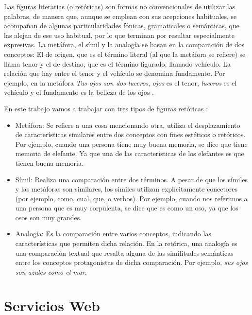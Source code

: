 Las figuras literarias (o retóricas) son formas no convencionales de utilizar las palabras, de manera que, aunque se emplean con sus acepciones habituales, se acompañan de algunas particularidades fónicas, gramaticales o semánticas, que las alejan de ese uso habitual, por lo que terminan por resultar especialmente expresivas. 
La metáfora, el símil y la analogía se basan en la comparación de dos conceptos: El de origen, que es el término literal (al que la metáfora se refiere) se llama tenor y el de destino, que es el término figurado, llamado vehículo. La relación que hay entre el tenor y el vehículo se denomina fundamento. Por ejemplo, en la metáfora \textit{Tus ojos son dos luceros}, \textit{ojos} es el tenor, \textit{luceros} es el vehículo y el fundamento es la belleza de los ojos \citep{GalianaYCasas1994}.


En este trabajo vamos a trabajar con tres tipos de figuras retóricas \citep{TFMPaloma2017}: 
\begin{itemize}
	\item Metáfora: Se refiere a una cosa mencionando otra, utiliza el desplazamiento de características similares entre dos conceptos con fines estéticos o retóricos. Por ejemplo, cuando una persona tiene muy buena memoria, se dice que tiene memoria de elefante. Ya que una de las características de los elefantes es que tienen buena memoria.
	
	\item Símil: Realiza una comparación entre dos términos. A pesar de que los símiles y las metáforas son similares, los símiles utilizan explícitamente conectores (por ejemplo, como, cual, que, o verbos).
	Por ejemplo, cuando nos referimos a una persona que es muy corpulenta, se dice que es como un oso, ya que los osos son muy grandes.
	
	\item Analogía: Es la comparación entre varios conceptos, indicando las características que permiten dicha relación. En la retórica, una analogía es una comparación textual que resalta alguna de las similitudes semánticas entre los conceptos protagonistas de dicha comparación. Por ejemplo, \textit{sus ojos son azules como el mar}.
	
	
	
\end{itemize}

\section{Servicios Web}
\label{cap:sec:serviciosweb}

